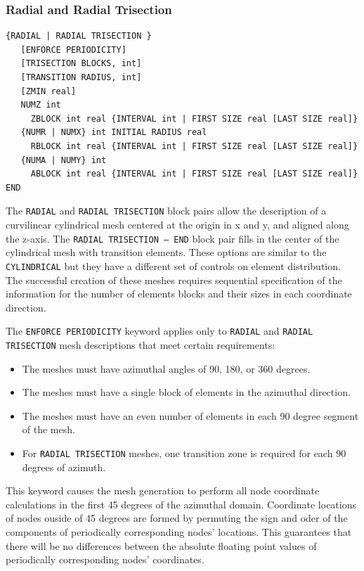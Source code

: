 \clearpage
\subsubsection {Radial and Radial Trisection}
{\ttfamily \begin{verbatim}
{RADIAL | RADIAL TRISECTION }
   [ENFORCE PERIODICITY]
   [TRISECTION BLOCKS, int]
   [TRANSITION RADIUS, int]
   [ZMIN real]
   NUMZ int
     ZBLOCK int real {INTERVAL int | FIRST SIZE real [LAST SIZE real]}
   {NUMR | NUMX} int INITIAL RADIUS real
     RBLOCK int real {INTERVAL int | FIRST SIZE real [LAST SIZE real]}
   {NUMA | NUMY} int
     ABLOCK int real {INTERVAL int | FIRST SIZE real [LAST SIZE real]}
END
\end{verbatim}
}

The \texttt{RADIAL} and \texttt{RADIAL TRISECTION} block pairs allow the description of
a
curvilinear cylindrical mesh centered at the origin in x and y, and
aligned along the z-axis.  The \texttt{RADIAL TRISECTION -- END}
block pair fills in the center of the cylindrical mesh with transition
elements.  These options are similar to the \texttt{CYLINDRICAL}
but they have a different set of controls on element distribution.  The
successful creation of these meshes requires sequential
specification of the information for the number of elements blocks and
their sizes in each coordinate direction.

The \texttt{ENFORCE PERIODICITY} keyword applies only to \texttt{RADIAL} and \texttt{RADIAL TRISECTION} mesh descriptions that meet certain requirements:
\begin{itemize}
  	\item The meshes must have azimuthal angles of 90, 180, or 360 degrees.
	\item The meshes must have a single block of elements in the azimuthal direction.
	\item The meshes must have an even number of elements in each 90 degree segment of the mesh.
	\item For \texttt{RADIAL TRISECTION} meshes, one transition zone is required for each 90 degrees of azimuth.
\end{itemize}

This keyword causes the mesh generation to perform all node coordinate calculations in the first 45 degrees of the azimuthal domain. Coordinate locations of nodes ouside of 45 degrees are formed by permuting the sign and oder of the components of periodically corresponding nodes' locations. This guarantees that there will be no differences between the absolute floating point values of periodically corresponding nodes' coordinates.

